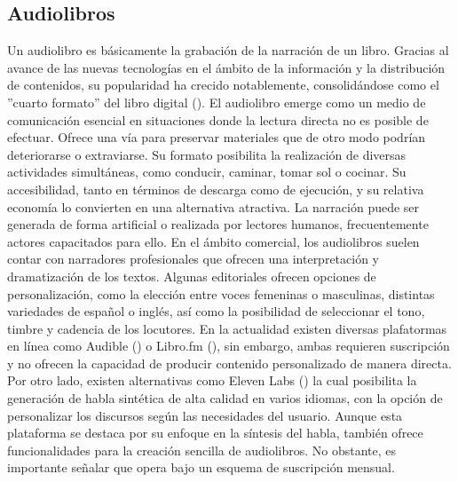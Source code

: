 \subsection{Audiolibros}
Un audiolibro es básicamente la grabación de la narración de un libro.
Gracias al avance de las nuevas tecnologías en el ámbito de la información y la distribución de contenidos, su popularidad ha crecido notablemente, consolidándose como el ''cuarto formato'' del libro digital (\cite{bencomo2022}). El audiolibro emerge como un medio de comunicación esencial en situaciones donde la lectura directa no es posible de efectuar. Ofrece una vía para preservar materiales que de otro modo podrían deteriorarse o extraviarse. Su formato posibilita la realización de diversas actividades simultáneas, como conducir, caminar, tomar sol o cocinar. Su accesibilidad, tanto en términos de descarga como de ejecución, y su relativa economía lo convierten en una alternativa atractiva. La narración puede ser generada de forma artificial o realizada por lectores humanos, frecuentemente actores capacitados para ello. En el ámbito comercial, los audiolibros suelen contar con narradores profesionales que ofrecen una interpretación y dramatización de los textos. Algunas editoriales ofrecen opciones de personalización, como la elección entre voces femeninas o masculinas, distintas variedades de español o inglés, así como la posibilidad de seleccionar el tono, timbre y cadencia de los locutores. En la actualidad existen diversas plafatormas en línea como Audible (\cite{audible}) o Libro.fm (\cite{librofm}), sin embargo, ambas requieren suscripción y no ofrecen la capacidad de producir contenido personalizado de manera directa. Por otro lado, existen alternativas como Eleven Labs (\cite{elevenlabs}) la cual posibilita la generación de habla sintética de alta calidad en varios idiomas, con la opción de personalizar los discursos según las necesidades del usuario. Aunque esta plataforma se destaca por su enfoque en la síntesis del habla, también ofrece funcionalidades para la creación sencilla de audiolibros. No obstante, es importante señalar que opera bajo un esquema de suscripción mensual.